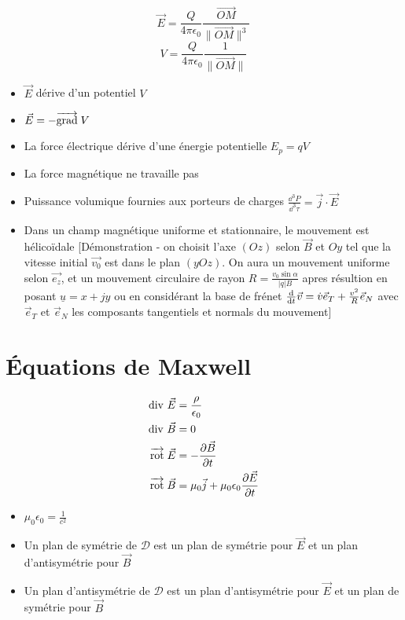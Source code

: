 \documentclass[openany]{book}
\begin{document}
\[ \vec{E} = \frac{Q}{4\pi\epsilon_0} \frac{\overrightarrow{OM}}{\|\overrightarrow{OM}\|^3} \]
\[ V = \frac{Q}{4\pi\epsilon_0} \frac{1}{\|\overrightarrow{OM}\|} \]

\begin{itemize}
    \item $\vec{E}$ dérive d'un potentiel $V$
    \item $\vec{E} = - \overrightarrow{{\text{grad}}} \; V $
    \item La force électrique dérive d'une énergie potentielle $E_p = qV$
    \item La force magnétique ne travaille pas
    \item Puissance volumique fournies aux porteurs de charges $\frac{\dd^3 P}{\dd^3 \tau} = \vec{j} \cdot \vec{E}$
    \item Dans un champ magnétique uniforme et stationnaire, le mouvement est hélicoïdale [Démonstration - on choisit l'axe $(Oz)$ selon $\vec{B}$ et $Oy$ tel que la vitesse initial $\vec{v_0}$ est dans le plan $(yOz)$. On aura un mouvement uniforme selon $\vec{e_z}$, et un mouvement circulaire de rayon $R = \frac{v_0 \sin \alpha}{|q|B}$ apres résultion en posant $ \underline{u} = x + jy $ ou en considérant la base de frénet $\frac{\text{d}}{\text{d}t}\vec{v} = \dot{v} \vec{e}_T + \frac{v^2}{R} \vec{e}_N$ avec $\vec{e}_T$ et $\vec{e}_N$ les composants tangentiels et normals du mouvement]
\end{itemize}

\section{Équations de Maxwell}

\begin{align*}
    \text{div } \vec{E} &= \frac{\rho}{\epsilon_0} \\
    \text{div } \vec{B} &= 0 \\
    \overrightarrow{\text{rot}} \; \vec{E} &= -\frac{\partial \vec{B}}{\partial t} \\
    \overrightarrow{\text{rot}} \; \vec{B} &= \mu_0 \vec{j} + \mu_0 \epsilon_0 \frac{\partial \vec{E}}{\partial t}
\end{align*}

\begin{itemize}
    \item $\mu_0 \epsilon_0 = \frac{1}{c^2}$
    \item Un plan de symétrie de $\mathcal{D}$ est un plan de symétrie pour $\vec{E}$ et un plan d'antisymétrie pour $\vec{B}$
    \item Un plan d'antisymétrie de $\mathcal{D}$ est un plan d'antisymétrie pour $\vec{E}$ et un plan de symétrie pour $\vec{B}$
\end{itemize}
\end{document}
